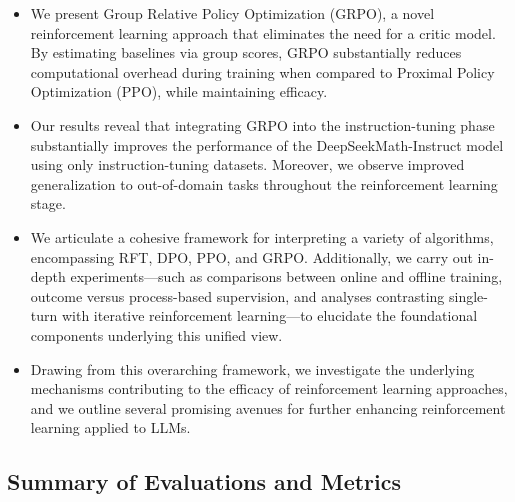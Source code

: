 \begin{itemize}[topsep=0pt]
    \item We present Group Relative Policy Optimization (GRPO), a novel reinforcement learning approach that eliminates the need for a critic model. By estimating baselines via group scores, GRPO substantially reduces computational overhead during training when compared to Proximal Policy Optimization (PPO), while maintaining efficacy.
    \item Our results reveal that integrating GRPO into the instruction-tuning phase substantially improves the performance of the DeepSeekMath-Instruct model using only instruction-tuning datasets. Moreover, we observe improved generalization to out-of-domain tasks throughout the reinforcement learning stage.
    \item We articulate a cohesive framework for interpreting a variety of algorithms, encompassing RFT, DPO, PPO, and GRPO. Additionally, we carry out in-depth experiments—such as comparisons between online and offline training, outcome versus process-based supervision, and analyses contrasting single-turn with iterative reinforcement learning—to elucidate the foundational components underlying this unified view.
    \item Drawing from this overarching framework, we investigate the underlying mechanisms contributing to the efficacy of reinforcement learning approaches, and we outline several promising avenues for further enhancing reinforcement learning applied to LLMs.
\end{itemize}

\subsection{Summary of Evaluations and Metrics}

